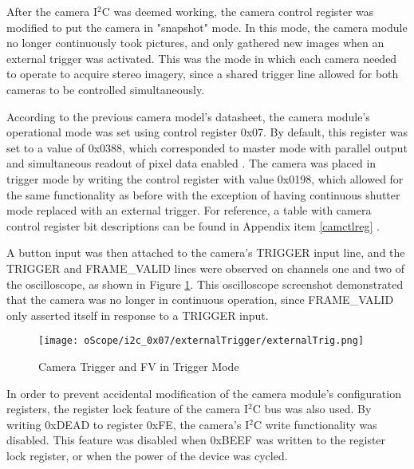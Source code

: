 \par
After the camera I$^2$C was deemed working, the camera control register was modified to put the camera in "snapshot" mode. In this mode, the camera module no longer continuously took pictures, and only gathered new images when an external trigger was activated. This was the mode in which each camera needed to operate to acquire stereo imagery, since a shared trigger line allowed for both cameras to be controlled simultaneously.
\par
According to the previous camera model's datasheet, the camera module's operational mode was set using control register 0x07. By default, this register was set to a value of 0x0388, which corresponded to master mode with parallel output and simultaneous readout of pixel data enabled \cite{mt9v032}. The camera was placed in trigger mode by writing the control register with value 0x0198, which allowed for the same functionality as before with the exception of having continuous shutter mode replaced with an external trigger. For reference, a table with camera control register bit descriptions can be found in Appendix item \ref{camctlreg} \cite{mt9v032}.
\par
A button input was then attached to the camera's TRIGGER input line, and the TRIGGER and FRAME\_VALID lines were observed on channels one and two of the oscilloscope, as shown in Figure \ref{camInTrigMode}. This oscilloscope screenshot demonstrated that the camera was no longer in continuous operation, since FRAME\_VALID only asserted itself in response to a TRIGGER input. 
\begin{figure}[H]
	\centerline{\texttt{[image: oScope/i2c\_0x07/externalTrigger/externalTrig.png]}}
	\caption{Camera Trigger and FV in Trigger Mode}
	\label{camInTrigMode}
\end{figure}
\par
In order to prevent accidental modification of the camera module's configuration registers, the register lock feature of the camera I$^2$C bus was also used. By writing 0xDEAD to register 0xFE, the camera's I$^2$C write functionality was disabled. This feature was disabled when 0xBEEF was written to the register lock register, or when the power of the device was cycled.
